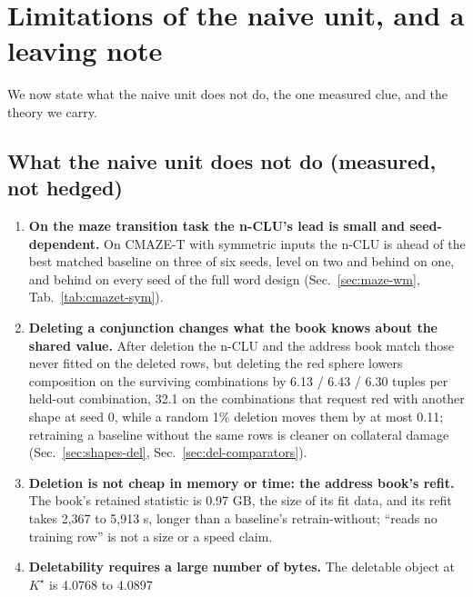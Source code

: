 \documentclass{article} %
\newcommand{\Kstar}{\ensuremath{K^{\star}}}
\begin{document}
\section{Limitations of the naive unit, and a leaving note}
\label{sec:limits}

We now state what the naive unit does not do, the one measured clue, and the theory we carry.
\subsection{What the naive unit does not do (measured, not hedged)}
\label{sec:limits-list}

\begin{enumerate}
\item \textbf{On the maze transition task the n-CLU's lead is small and seed-dependent.}
  On CMAZE-T with symmetric inputs the n-CLU is ahead of the best matched baseline on three of six seeds,
  level on two and behind on one, and behind on every seed of the full word design %
  (Sec.~\ref{sec:maze-wm}, Tab.~\ref{tab:cmazet-sym}).
\item \textbf{Deleting a conjunction changes what the book knows about the shared value.} After deletion
  the n-CLU and the address book match those never fitted on the deleted rows, but deleting the red
  sphere lowers composition on
  the surviving combinations by 6.13 / 6.43 / 6.30 tuples per held-out combination, 32.1 on the combinations that request red %
  with another shape at seed 0, while a random 1\% deletion moves them by at most 0.11; retraining a %
  baseline without the same rows is cleaner on collateral damage (Sec.~\ref{sec:shapes-del},
  Sec.~\ref{sec:del-comparators}).
\item \textbf{Deletion is not cheap in memory or time: the address book's refit.} The book's retained statistic is 0.97 GB, %
  the size of its fit data, and its refit takes 2,367 to 5,913 s, longer than a baseline's %
  retrain-without; ``reads no training row'' is not a size or a speed claim.
\item \textbf{Deletability requires a large number of bytes.} The deletable object at $\Kstar$ is 4.0768 to 4.0897

\end{enumerate}
\end{document}
